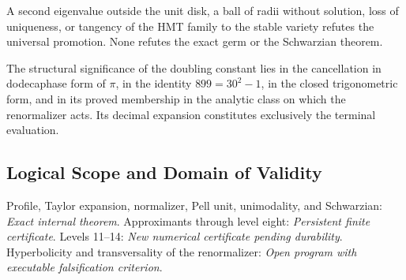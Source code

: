 \begin{remark}
A second eigenvalue outside the unit disk, a ball of radii without solution, loss of uniqueness, or tangency of the HMT family to the stable variety refutes the universal promotion. None refutes the exact germ or the Schwarzian theorem.
\end{remark}

\begin{proposition}
The structural significance of the doubling constant lies in the
cancellation in dodecaphase form of \(\pi\), in the identity
\(899=30^2-1\), in the closed trigonometric form, and in its proved membership
in the analytic class on which the renormalizer acts. Its
decimal expansion constitutes exclusively the terminal evaluation.
\end{proposition}

\subsection*{Logical Scope and Domain of Validity}
Profile, Taylor expansion, normalizer, Pell unit, unimodality, and Schwarzian: \emph{Exact internal theorem}. Approximants through level eight: \emph{Persistent finite certificate}. Levels 11--14: \emph{New numerical certificate pending durability}. Hyperbolicity and transversality of the renormalizer: \emph{Open program with executable falsification criterion}.

